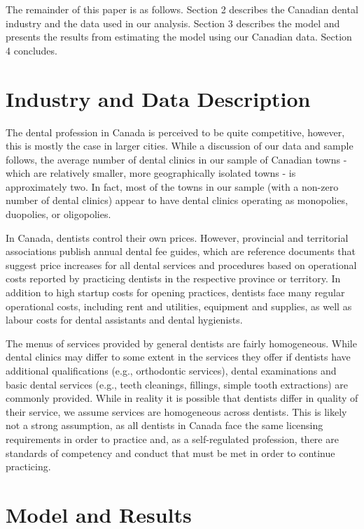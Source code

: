 \documentclass[a4paper,11pt]{article}
\begin{document}
The remainder of this paper is as follows. Section 2 describes the Canadian dental industry and the data used in our analysis. Section 3 describes the model and presents the results from estimating the model using our Canadian data. Section 4 concludes.

\section{Industry and Data Description}
The dental profession in Canada is perceived to be quite competitive, however, this is mostly the case in larger cities. While a discussion of our data and sample follows, the average number of dental clinics in our sample of Canadian towns - which are relatively smaller, more geographically isolated towns - is approximately two. In fact, most of the towns in our sample (with a non-zero number of dental clinics) appear to have dental clinics operating as monopolies, duopolies, or oligopolies.

In Canada, dentists control their own prices. However, provincial and territorial associations publish annual dental fee guides, which are reference documents that suggest price increases for all dental services and procedures based on operational costs reported by practicing dentists in the respective province or territory. In addition to high startup costs for opening practices, dentists face many regular operational costs, including rent and utilities, equipment and supplies, as well as labour costs for dental assistants and dental hygienists.

The menus of services provided by general dentists are fairly homogeneous. While dental clinics may differ to some extent in the services they offer if dentists have additional qualifications (e.g., orthodontic services), dental examinations and basic dental services (e.g., teeth cleanings, fillings, simple tooth extractions) are commonly provided. While in reality it is possible that dentists differ in quality of their service, we assume services are homogeneous across dentists. This is likely not a strong assumption, as all dentists in Canada face the same licensing requirements in order to practice and, as a self-regulated profession, there are standards of competency and conduct that must be met in order to continue practicing.

\section{Model and Results}
\end{document}
